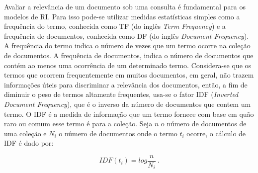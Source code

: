 

% 
% 
% 




Avaliar a relevância de um documento sob uma consulta é fundamental para os modelos de RI. Para isso pode-se utilizar medidas estatísticas simples como a frequência do termo, conhecida como TF (do inglês \textit{Term Frequency}) e a frequência de documentos, conhecida como DF (do inglês \textit{Document Frequency}). A frequência do termo indica o número de vezes que um termo ocorre na coleção de documentos. A frequência de documentos, indica o número de documentos que contém ao menos uma ocorrência de um determinado termo. Considera-se que os termos que ocorrem frequentemente em muitos documentos, em geral, não trazem informações úteis para discriminar a relevância dos documentos, então, a fim de diminuir o peso de termos altamente frequentes, usa-se o fator IDF (\textit{Inverted Document Frequency}), que é o inverso da número de documentos que contem um termo. O IDF é a medida de informação que um termo fornece com base em quão raro ou comum esse termo é para a coleção. Seja $n$ o número de documentos de uma coleção e $N_i$ o número de documentos onde o termo $t_i$ ocorre, o cálculo de IDF é dado por: 

	\begin{equation}
		IDF(t_i) = log\frac{n}{N_i}~.
		\label{equ:IDF}
	\end{equation}

